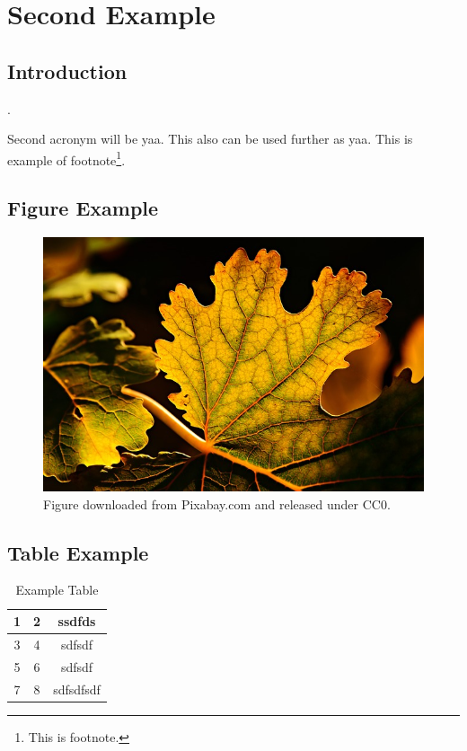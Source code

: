 
\chapter{Second Example}

\section{Introduction}
\blindtext {}
\cite{Suratekar2018}. 

Second acronym will be \gls{yaa}. This also can be used further as \gls{yaa}. This is example of footnote\footnote{This is footnote.}.
\section{Figure Example}
\blindtext 
\begin{figure}
	\centering
	\includegraphics[width=0.7\linewidth]{figs/example}
	\caption{Figure downloaded from Pixabay.com and released under CC0.}
	\label{fig:example}
\end{figure}
\blindtext {}

\section{Table Example}
\blindtext {}

\begin{table}
	\centering
\begin{tabular}{|c|c|c|}
	\hline 
1	&  2& ssdfds \\ 
	\hline 
3	& 4 & sdfsdf \\ 
	\hline 
5	& 6 &  sdfsdf\\ 
	\hline 
7	&  8&  sdfsdfsdf\\ 
	\hline 
\end{tabular}
\caption{Example Table} 
\end{table}

\blindtext 

\blindtext 

\clearpage
